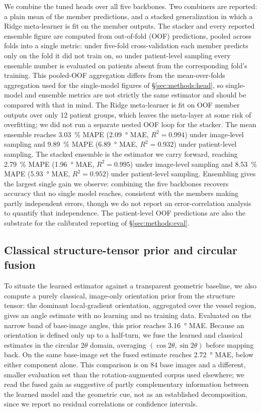 We combine the tuned heads over all five backbones. Two combiners are reported: a plain mean of the member predictions, and a stacked generalization \citep{Wolpert1992} in which a Ridge meta-learner is fit on the member outputs. The stacker and every reported ensemble figure are computed from out-of-fold (OOF) predictions, pooled across folds into a single metric: under five-fold cross-validation each member predicts only on the fold it did not train on, so under patient-level sampling every ensemble number is evaluated on patients absent from the corresponding fold's training. This pooled-OOF aggregation differs from the mean-over-folds aggregation used for the single-model figures of \S\ref{sec:methods:head}, so single-model and ensemble metrics are not strictly the same estimator and should be compared with that in mind. The Ridge meta-learner is fit on OOF member outputs over only \num{12} patient groups, which leaves the meta-layer at some risk of overfitting; we did not run a separate nested OOF loop for the stacker. The mean ensemble reaches \SI{3.03}{\percent} MAPE (\SI{2.09}{\degree} MAE, $R^2=0.994$) under image-level sampling and \SI{9.89}{\percent} MAPE (\SI{6.89}{\degree} MAE, $R^2=0.932$) under patient-level sampling. The stacked ensemble is the estimator we carry forward, reaching \SI{2.79}{\percent} MAPE (\SI{1.96}{\degree} MAE, $R^2=0.995$) under image-level sampling and \SI{8.53}{\percent} MAPE (\SI{5.93}{\degree} MAE, $R^2=0.952$) under patient-level sampling. Ensembling gives the largest single gain we observe: combining the five backbones recovers accuracy that no single model reaches, consistent with the members making partly independent errors, though we do not report an error-correlation analysis to quantify that independence. The patient-level OOF predictions are also the substrate for the calibrated reporting of \S\ref{sec:methods:eval}.

\subsection{Classical structure-tensor prior and circular fusion}
\label{sec:methods:fusion}

To situate the learned estimator against a transparent geometric baseline, we also compute a purely classical, image-only orientation prior from the structure tensor: the dominant local-gradient orientation, aggregated over the vessel region, gives an angle estimate with no learning and no training data. Evaluated on the narrow band of base-image angles, this prior reaches \SI{3.16}{\degree} MAE. Because an orientation is defined only up to a half-turn, we fuse the learned and classical estimates in the circular $2\theta$ domain, averaging $(\cos 2\theta,\sin 2\theta)$ before mapping back. On the same base-image set the fused estimate reaches \SI{2.72}{\degree} MAE, below either component alone. This comparison is on \num{84} base images and a different, smaller evaluation set than the rotation-augmented corpus used elsewhere; we read the fused gain as suggestive of partly complementary information between the learned model and the geometric cue, not as an established decomposition, since we report no residual correlations or confidence intervals.

